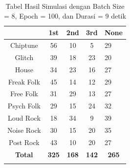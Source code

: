 \begin{longtable}[c]{|c|c|c|c|l|}
	\hline
	\textbf{}      & \textbf{1st} & \textbf{2nd} & \textbf{3rd} & \textbf{None}                     \\ \hline
	\endfirsthead
	\endhead
	Chiptune       & 56           & 10           & 5            & 29                                \\ \hline
	Glitch         & 39           & 18           & 23           & 20                                \\ \hline
	House          & 34           & 23           & 16           & 27                                \\ \hline
	Freak Folk     & 45           & 14           & 12           & 29                                \\ \hline
	Free Folk      & 31           & 29           & 13           & 27                                \\ \hline
	Psych Folk     & 29           & 15           & 24           & 32                                \\ \hline
	Loud Rock      & 18           & 34           & 9            & 39                                \\ \hline
	Noise Rock     & 30           & 15           & 20           & 35                                \\ \hline
	Post Rock      & 43           & 10           & 20           & 27                                \\ \hline
	\textbf{Total} & \textbf{325} & \textbf{168} & \textbf{142} & \multicolumn{1}{c|}{\textbf{265}} \\ \hline
	\caption{Tabel Hasil Simulasi dengan Batch Size = 8, Epoch = 100, dan Durasi = 9 detik}
	\label{tab:my-table}\\
\end{longtable}


